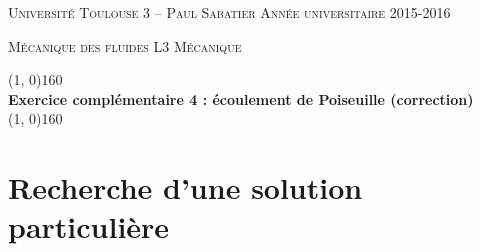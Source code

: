 \documentclass[10pt, a4paper]{article}
\renewcommand{\thickline}[2]{\linethickness{#1} \line(1, 0){#2}}
\begin{document}

\begin{center}

  \textsc{Université Toulouse 3 -- Paul Sabatier \hfill Année universitaire 2015-2016}
  
  \textsc{Mécanique des fluides \hfill L3 Mécanique}
  
  \vspace{0mm}
  
  \begin{center}
    \thickline{0.4mm}{160}
    \\ \vspace{3mm}
  \textbf{\large Exercice complémentaire 4 : écoulement de Poiseuille (correction)}
    \\ %
    \thickline{0.4mm}{160}
  \end{center}

  
\end{center}


\medskip

\section{Recherche d'une solution particulière}
\end{document}
